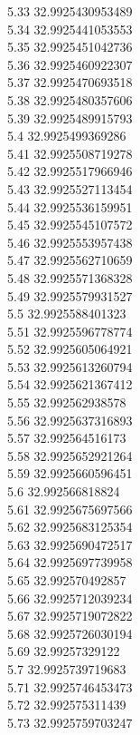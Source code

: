 {5.33	32.9925430953489\\
5.34	32.9925441053553\\
5.35	32.9925451042736\\
5.36	32.9925460922307\\
5.37	32.9925470693518\\
5.38	32.9925480357606\\
5.39	32.9925489915793\\
5.4	32.9925499369286\\
5.41	32.9925508719278\\
5.42	32.9925517966946\\
5.43	32.9925527113454\\
5.44	32.9925536159951\\
5.45	32.9925545107572\\
5.46	32.9925553957438\\
5.47	32.9925562710659\\
5.48	32.9925571368328\\
5.49	32.9925579931527\\
5.5	32.9925588401323\\
5.51	32.9925596778774\\
5.52	32.9925605064921\\
5.53	32.9925613260794\\
5.54	32.9925621367412\\
5.55	32.992562938578\\
5.56	32.9925637316893\\
5.57	32.992564516173\\
5.58	32.9925652921264\\
5.59	32.9925660596451\\
5.6	32.992566818824\\
5.61	32.9925675697566\\
5.62	32.9925683125354\\
5.63	32.9925690472517\\
5.64	32.9925697739958\\
5.65	32.992570492857\\
5.66	32.9925712039234\\
5.67	32.9925719072822\\
5.68	32.9925726030194\\
5.69	32.99257329122\\
5.7	32.9925739719683\\
5.71	32.9925746453473\\
5.72	32.992575311439\\
5.73	32.9925759703247\\
}
